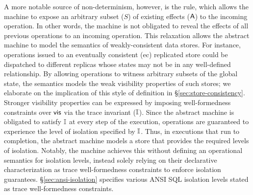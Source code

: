 A more notable source of non-determinism, however, is the
 rule, which allows the machine to expose an
arbitrary subset ($S$) of existing effects ($\textsf{A}$) to the incoming
operation. In other words, the machine is not obligated to reveal the
effects of all previous operations to an incoming operation. This
relaxation allows the abstract machine to model the semantics of
weakly-consistent data stores. For instance, operations issued to an
eventually consistent ({\sc ec}) replicated store could be dispatched
to different replicas whose states may not be in any well-defined
relationship. By allowing operations to witness arbitrary subsets of
the global state, the semantics models the weak visibility properties
of such stores; we elaborate on the implication of this style of
definition in \S\ref{sec:store-consistency}.  Stronger visibility
properties can be expressed by imposing well-formedness constraints
over $\textsf{vis}$ via the trace invariant ($\mathbb{I}$). Since the abstract
machine is obligated to satisfy $\mathbb{I}$ at every step of the execution,
operations are guaranteed to experience the level of isolation
specified by $\mathbb{I}$.  Thus, in executions that run to completion, the
abstract machine models a store that provides the required levels of
isolation.  Notably, the machine achieves this without defining an
operational semantics for isolation levels, instead solely relying on
their declarative characterization as trace well-formedness
constraints to enforce isolation guarantees.
\S\ref{sec:ansi-isolation} specifies various ANSI SQL isolation levels
stated as trace well-formedness constraints.





